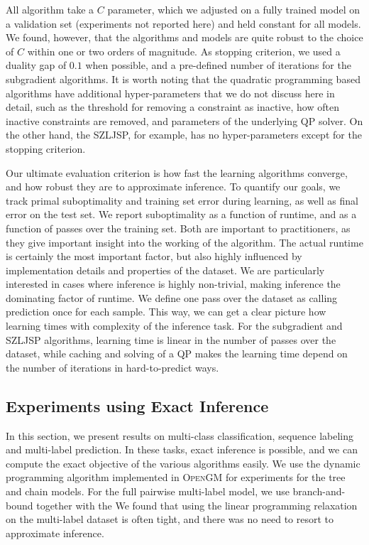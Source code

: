 All algorithm take a $C$ parameter, which we adjusted on a fully trained model
on a validation set (experiments not reported here) and held constant for all
models.  We found, however, that the algorithms and models are quite robust to
the choice of $C$ within one or two orders of magnitude.
As stopping criterion, we used a duality gap of $0.1$ when possible, and a
pre-defined number of iterations for the subgradient algorithms. It is worth
noting that the quadratic programming based algorithms have additional
hyper-parameters that we do not discuss here in detail, such as the threshold
for removing a constraint as inactive, how often inactive constraints are
removed, and parameters of the underlying QP solver. On the other hand, the
SZLJSP, for example, has no hyper-parameters except for the stopping criterion.

Our ultimate evaluation criterion is how fast the learning algorithms converge,
and how robust they are to approximate inference.  To quantify our goals, we
track primal suboptimality and training set error during learning, as well as
final error on the test set.
We report suboptimality as a function of runtime, and as a function of passes
over the training set.  Both are important to practitioners, as they give
important insight into the working of the algorithm.  The actual runtime is
certainly the most important factor, but also highly influenced by
implementation details and properties of the dataset. We are particularly
interested in cases where inference is highly non-trivial, making inference the
dominating factor of runtime.
We define one pass over the dataset as calling prediction once for each sample.
This way, we can get a clear picture how learning times with complexity of the
inference task. For the subgradient and SZLJSP algorithms, learning time is linear
in the number of passes over the dataset, while caching and solving of a QP makes
the learning time depend on the number of iterations in hard-to-predict ways.

\subsection{Experiments using Exact Inference}
In this section, we present results on multi-class classification, sequence
labeling and multi-label prediction. In these
tasks, exact inference is possible, and we can compute the exact objective of
the various algorithms easily. We use the dynamic programming algorithm
implemented in \textsc{OpenGM} for experiments for the tree and chain models.
For the full pairwise multi-label model, we use branch-and-bound together with the %
We found that using the linear programming relaxation on the multi-label
dataset is often tight, and there was no need to resort to approximate
inference.

